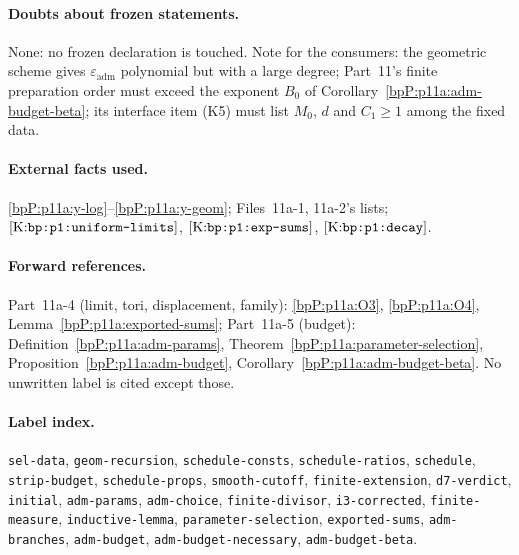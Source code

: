 \paragraph{Doubts about frozen statements.} None: no frozen declaration is touched. Note for the consumers: the geometric scheme gives $\varepsilon_{\mathrm{adm}}$ polynomial but with a large degree; Part~11's finite preparation order must exceed the exponent $B_0$ of Corollary~\ref{bpP:p11a:adm-budget-beta}; its interface item (K5) must list $M_0$, $d$ and $C_1\ge1$ among the fixed data.

\paragraph{External facts used.} \ref{bpP:p11a:y-log}--\ref{bpP:p11a:y-geom}; Files~11a-1, 11a-2's lists; $\textup{[K:\texttt{bp:p1:uniform-limits}]}$, $\textup{[K:\texttt{bp:p1:exp-sums}]}$, $\textup{[K:\texttt{bp:p1:decay}]}$.

\paragraph{Forward references.} Part~11a-4 (limit, tori, displacement, family): \ref{bpP:p11a:O3}, \ref{bpP:p11a:O4}, Lemma~\ref{bpP:p11a:exported-sums}; Part~11a-5 (budget): Definition~\ref{bpP:p11a:adm-params}, Theorem~\ref{bpP:p11a:parameter-selection}, Proposition~\ref{bpP:p11a:adm-budget}, Corollary~\ref{bpP:p11a:adm-budget-beta}. No unwritten label is cited except those.

\paragraph{Label index.} \texttt{sel-data}, \texttt{geom-recursion}, \texttt{schedule-consts}, \texttt{schedule-ratios}, \texttt{schedule}, \texttt{strip-budget}, \texttt{schedule-props}, \texttt{smooth-cutoff}, \texttt{finite-extension}, \texttt{d7-verdict}, \texttt{initial}, \texttt{adm-params}, \texttt{adm-choice}, \texttt{finite-divisor}, \texttt{i3-corrected}, \texttt{finite-measure}, \texttt{inductive-lemma}, \texttt{parameter-selection}, \texttt{exported-sums}, \texttt{adm-branches}, \texttt{adm-budget}, \texttt{adm-budget-necessary}, \texttt{adm-budget-beta}.
\par\endgroup
